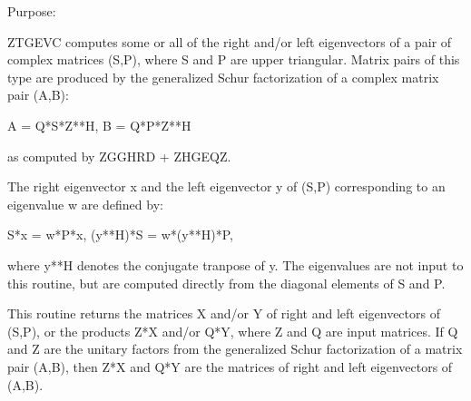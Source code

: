  \begin{DoxyParagraph}{Purpose\+: }
\begin{DoxyVerb} ZTGEVC computes some or all of the right and/or left eigenvectors of
 a pair of complex matrices (S,P), where S and P are upper triangular.
 Matrix pairs of this type are produced by the generalized Schur
 factorization of a complex matrix pair (A,B):
 
    A = Q*S*Z**H,  B = Q*P*Z**H
 
 as computed by ZGGHRD + ZHGEQZ.
 
 The right eigenvector x and the left eigenvector y of (S,P)
 corresponding to an eigenvalue w are defined by:
 
    S*x = w*P*x,  (y**H)*S = w*(y**H)*P,
 
 where y**H denotes the conjugate tranpose of y.
 The eigenvalues are not input to this routine, but are computed
 directly from the diagonal elements of S and P.
 
 This routine returns the matrices X and/or Y of right and left
 eigenvectors of (S,P), or the products Z*X and/or Q*Y,
 where Z and Q are input matrices.
 If Q and Z are the unitary factors from the generalized Schur
 factorization of a matrix pair (A,B), then Z*X and Q*Y
 are the matrices of right and left eigenvectors of (A,B).\end{DoxyVerb}
 
\end{DoxyParagraph}

